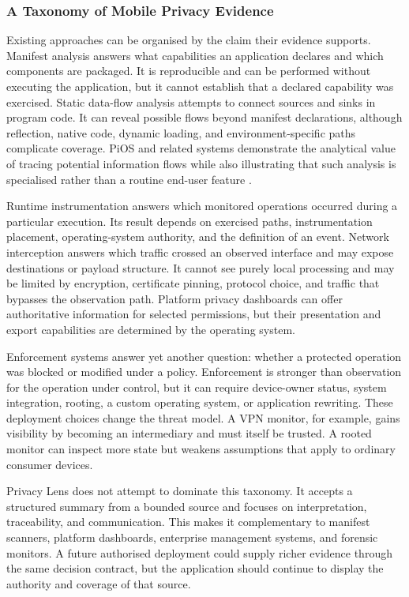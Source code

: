 \subsubsection{A Taxonomy of Mobile Privacy Evidence}

Existing approaches can be organised by the claim their evidence supports. Manifest analysis answers what capabilities an application declares and which components are packaged. It is reproducible and can be performed without executing the application, but it cannot establish that a declared capability was exercised. Static data-flow analysis attempts to connect sources and sinks in program code. It can reveal possible flows beyond manifest declarations, although reflection, native code, dynamic loading, and environment-specific paths complicate coverage. PiOS and related systems demonstrate the analytical value of tracing potential information flows while also illustrating that such analysis is specialised rather than a routine end-user feature \cite{49}.

Runtime instrumentation answers which monitored operations occurred during a particular execution. Its result depends on exercised paths, instrumentation placement, operating-system authority, and the definition of an event. Network interception answers which traffic crossed an observed interface and may expose destinations or payload structure. It cannot see purely local processing and may be limited by encryption, certificate pinning, protocol choice, and traffic that bypasses the observation path. Platform privacy dashboards can offer authoritative information for selected permissions, but their presentation and export capabilities are determined by the operating system.

Enforcement systems answer yet another question: whether a protected operation was blocked or modified under a policy. Enforcement is stronger than observation for the operation under control, but it can require device-owner status, system integration, rooting, a custom operating system, or application rewriting. These deployment choices change the threat model. A VPN monitor, for example, gains visibility by becoming an intermediary and must itself be trusted. A rooted monitor can inspect more state but weakens assumptions that apply to ordinary consumer devices.

Privacy Lens does not attempt to dominate this taxonomy. It accepts a structured summary from a bounded source and focuses on interpretation, traceability, and communication. This makes it complementary to manifest scanners, platform dashboards, enterprise management systems, and forensic monitors. A future authorised deployment could supply richer evidence through the same decision contract, but the application should continue to display the authority and coverage of that source.

